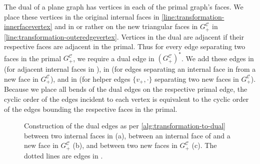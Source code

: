 The dual of a plane graph has vertices in each of the primal graph's faces.
We place these vertices in the original internal faces in \cref{line:transformation-innerfacevertex} and in \emdash{} or rather on \emdash{} the new triangular faces in $G_+^\mathcal{C}$ in \cref{line:transformation-outeredgevertex}.
Vertices in the dual are adjacent if their respective faces are adjacent in the primal.
Thus for every edge separating two faces in the primal $G_+^\mathcal{C}$, we require a dual edge in $(G_+^\mathcal{C})^*$.
We add these edges in  (for adjacent internal faces in \clustergraph{}), in  (for edges separating an internal face in \clustergraph{} from a new face in $G_+^\mathcal{C}$), and in  (for helper edges $\{v_+,\cdot\}$ separating two new faces in $G_+^\mathcal{C}$).
Because we place all bends of the dual edges on the respective primal edge, the cyclic order of the edges incident to each vertex is equivalent to the cyclic order of the edges bounding the respective faces in the primal.

\begin{figure}[H]
	\centering
	\quad
	\caption{Construction of the dual edges as per \cref{alg:transformation-to-dual} between two internal faces in \clustergraph{} (a), between an internal face of \clustergraph{} and a new face in $G_+^\mathcal{C}$ (b), and between two new faces in $G_+^\mathcal{C}$ (c). The dotted lines are edges in \clustergraph{}.}
	\label{fig:transformation-dual-edge-construction}
\end{figure}

